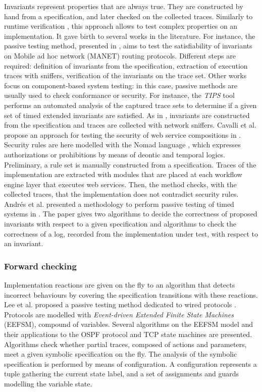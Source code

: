Invariants represent properties that are always true. They are
constructed by hand from a specification, and later checked on
the collected traces. Similarly to runtime verification
\cite{Leucker2009293}, this approach allows to test complex
properties on an implementation. It gave birth to several works
in the literature. For instance, the passive testing method,
presented in \cite{CMdO09}, aims to test the satisfiability of
invariants on Mobile ad hoc network (MANET) routing protocols.
Different steps are required: definition of invariants from the
specification, extraction of execution traces with sniffers,
verification of the invariants on the trace set. Other works
focus on component-based system testing: in this case, passive
methods are usually used to check conformance or security. For
instance, the \textit{TIPS} tool \cite{5552735} performs an
automated analysis of the captured trace sets to determine if a
given set of timed extended invariants are satisfied. As in
\cite{CMdO09}, invariants are constructed from the specification
and traces are collected with network sniffers. Cavalli et al.
propose an approach for testing the security of web service
compositions in \cite{cavalli2009passive}. Security rules are
here modelled with the Nomad language \cite{cuppens2005nomad},
which expresses authorizations or prohibitions by means of
deontic and temporal logics. Preliminary, a rule set is manually
constructed from a specification. Traces of the implementation
are extracted with modules that are placed at each workflow
engine layer that executes web services. Then, the method checks,
with the collected traces, that the implementation does not
contradict security rules. Andrés et al. presented a methodology
to perform passive testing of timed systems in
\cite{andres2012formal}. The paper gives two algorithms to decide
the correctness of proposed invariants with respect to a given
specification and algorithms to check the correctness of a log,
recorded from the implementation under test, with respect to an
invariant.

\subsubsection{Forward checking}

Implementation reactions are given on the fly to an algorithm
that detects incorrect behaviours by covering the specification
transitions with these reactions. Lee et al. proposed a passive
testing method dedicated to wired protocols \cite{1621118}.
Protocols are modelled with \textit{Event-driven Extended Finite
State Machines} (EEFSM), compound of variables.  Several
algorithms on the EEFSM model and their applications to the OSPF
protocol and TCP state machines are presented. Algorithms check
whether partial traces, composed of actions and parameters, meet
a given symbolic specification on the fly. The analysis of the
symbolic specification is performed by means of configuration. A
configuration represents a tuple gathering the current state
label, and a set of assignments and guards modelling the variable
state.

